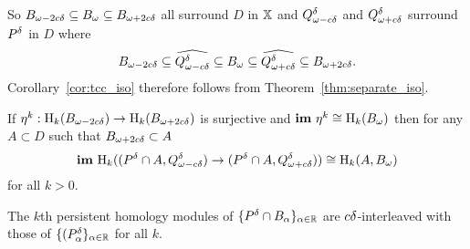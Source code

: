 So $\b\subseteq \B\subseteq \BB$ all surround $D$ in $\X$ and $\Q^\of$ and $\QQ^\of$ surround $P^\of$ in $D$ where
\[ \b\subseteq \ext{\Q^\of}\subseteq \B\subseteq \ext{\QQ^\of}\subseteq \BB.\]
Corollary~\ref{cor:tcc_iso} therefore follows from Theorem~\ref{thm:separate_iso}.

\begin{corollary}\label{cor:tcc_iso}
  If $\eta^k : \hom_k(\b)\to \hom_k(\BB)$ is surjective and $\im~\eta^k\cong \hom_k(\bb)$ then for any $A\subset D$ such that $\BB\subset A$
  \[ \im~\hom_k((\P\cap A, \Q^\of)\to (\P\cap A, \QQ^\of))\cong \hom_k(A, \bb)\]
  for all $k > 0$.
\end{corollary}

\begin{lemma}\label{lem:ps_inter}
  The $k$th persistent homology modules of $\{\P\cap B_\alpha\}_{\alpha\in\R}$ are $c\of$-interleaved with those of $\{(P_\alpha^\of\}_{\alpha\in\R}$ for all $k$.
\end{lemma}
